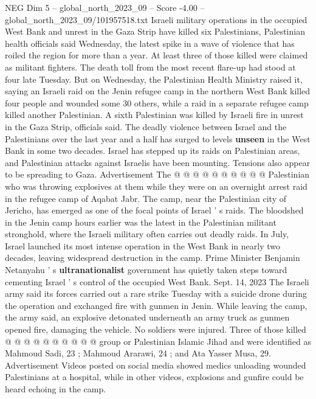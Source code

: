 \begin{textsample}{NEG Dim 5 – global\_north\_2023\_09 – Score -4.00 – global\_north\_2023\_09/101957518.txt}  \label{ex:f5_neg_004}
Israeli military operations in the occupied West Bank and unrest in the Gaza Strip have killed six Palestinians, Palestinian health officials said Wednesday, the latest spike in a wave of violence that has roiled the region for more than a year.
At least three of those killed were claimed as militant fighters.
The death toll from the most recent flare-up had stood at four late Tuesday.
But on Wednesday, the Palestinian Health Ministry raised it, saying an Israeli raid on the Jenin refugee camp in the northern West Bank killed four people and wounded some 30 others, while a raid in a separate refugee camp killed another Palestinian.
A sixth Palestinian was killed by Israeli fire in unrest in the Gaza Strip, officials said.
The deadly violence between Israel and the Palestinians over the last year and a half has surged to levels \textbf{unseen} in the West Bank in some two decades.
Israel has stepped up its raids on Palestinian areas, and Palestinian attacks against Israelis have been mounting.
Tensions also appear to be spreading to Gaza.
Advertisement The @ @ @ @ @ @ @ @ @ @ Palestinian who was throwing explosives at them while they were on an overnight arrest raid in the refugee camp of Aqabat Jabr.
The camp, near the Palestinian city of Jericho, has emerged as one of the focal points of Israel ' s raids.
The bloodshed in the Jenin camp hours earlier was the latest in the Palestinian militant stronghold, where the Israeli military often carries out deadly raids.
In July, Israel launched its most intense operation in the West Bank in nearly two decades, leaving widespread destruction in the camp.
Prime Minister Benjamin Netanyahu ' s \textbf{ultranationalist} government has quietly taken steps toward cementing Israel ' s control of the occupied West Bank.
Sept. 14, 2023 The Israeli army said its forces carried out a rare strike Tuesday with a suicide drone during the operation and exchanged fire with gunmen in Jenin.
While leaving the camp, the army said, an explosive detonated underneath an army truck as gunmen opened fire, damaging the vehicle.
No soldiers were injured.
Three of those killed @ @ @ @ @ @ @ @ @ @ group or Palestinian Islamic Jihad and were identified as Mahmoud Sadi, 23 ; Mahmoud Ararawi, 24 ; and Ata Yasser Musa, 29.
Advertisement Videos posted on social media showed medics unloading wounded Palestinians at a hospital, while in other videos, explosions and gunfire could be heard echoing in the camp.

\end{textsample}

